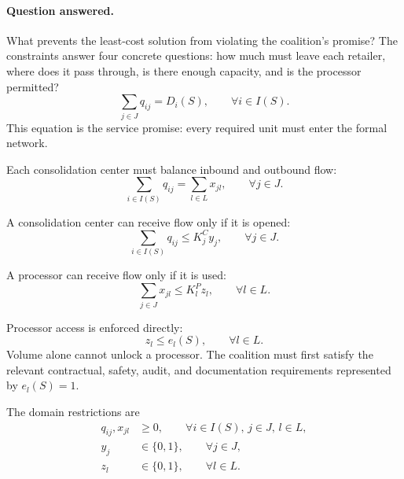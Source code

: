 \paragraph{Question answered.}
What prevents the least-cost solution from violating the coalition's promise? The constraints answer four concrete questions: how much must leave each retailer, where does it pass through, is there enough capacity, and is the processor permitted?
\begin{equation}
\label{eq:con_retailer}
\sum_{j\in J} q_{ij}=D_i(S),
\qquad \forall i\in I(S).
\end{equation}
This equation is the service promise: every required unit must enter the formal network.

Each consolidation center must balance inbound and outbound flow:
\begin{equation}
\label{eq:con_consolidation}
\sum_{i\in I(S)} q_{ij}=\sum_{l\in L}x_{jl},
\qquad \forall j\in J.
\end{equation}

A consolidation center can receive flow only if it is opened:
\begin{equation}
\label{eq:con_cap_c}
\sum_{i\in I(S)}q_{ij}\leq K_j^C y_j,
\qquad \forall j\in J.
\end{equation}

A processor can receive flow only if it is used:
\begin{equation}
\label{eq:con_cap_p}
\sum_{j\in J}x_{jl}\leq K_l^P z_l,
\qquad \forall l\in L.
\end{equation}

Processor access is enforced directly:
\begin{equation}
\label{eq:con_processor_access}
z_l\leq e_l(S),
\qquad \forall l\in L.
\end{equation}
Volume alone cannot unlock a processor. The coalition must first satisfy the relevant contractual, safety, audit, and documentation requirements represented by $e_l(S)=1$.

The domain restrictions are
\begin{equation}
\label{eq:con_domain}
\begin{aligned}
q_{ij},x_{jl}&\geq 0,
\qquad \forall i\in I(S),\, j\in J,\, l\in L,\\
y_j&\in\{0,1\},
\qquad \forall j\in J,\\
z_l&\in\{0,1\},
\qquad \forall l\in L.
\end{aligned}
\end{equation}

